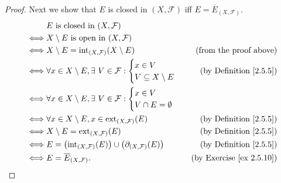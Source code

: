 \begin{proof}
    Next we show that \(E\) is closed in \((X, \mathcal{F})\) iff \(E = \overline{E}_{(X, \mathcal{F})}\).
    \begin{align*}
             & E \text{ is closed in } (X, \mathcal{F})                                                                                            \\
        \iff & X \setminus E \text{ is open in } (X, \mathcal{F})                                                                                  \\
        \iff & X \setminus E = \text{int}_{(X, \mathcal{F})}(X \setminus E)                                 & \text{(from the proof above)}        \\
        \iff & \forall x \in X \setminus E, \exists\ V \in \mathcal{F} : \begin{cases}
                                                                             x \in V \\
                                                                             V \subseteq X \setminus E
                                                                         \end{cases}                      & \text{(by Definition \ref{2.5.5})}     \\
        \iff & \forall x \in X \setminus E, \exists\ V \in \mathcal{F} : \begin{cases}
                                                                             x \in V \\
                                                                             V \cap E = \emptyset
                                                                         \end{cases}                                                       \\
        \iff & \forall x \in X \setminus E, x \in \text{ext}_{(X, \mathcal{F})}(E)                          & \text{(by Definition \ref{2.5.5})}   \\
        \iff & X \setminus E = \text{ext}_{(X, \mathcal{F})}(E)                                             & \text{(by Definition \ref{2.5.5})}   \\
        \iff & E = \big(\text{int}_{(X, \mathcal{F})}(E)\big) \cup \big(\partial_{(X, \mathcal{F})}(E)\big) & \text{(by Definition \ref{2.5.5})}   \\
        \iff & E = \overline{E}_{(X, \mathcal{F})}.                                                         & \text{(by Exercise \ref{ex 2.5.10})}
    \end{align*}


\end{proof}
